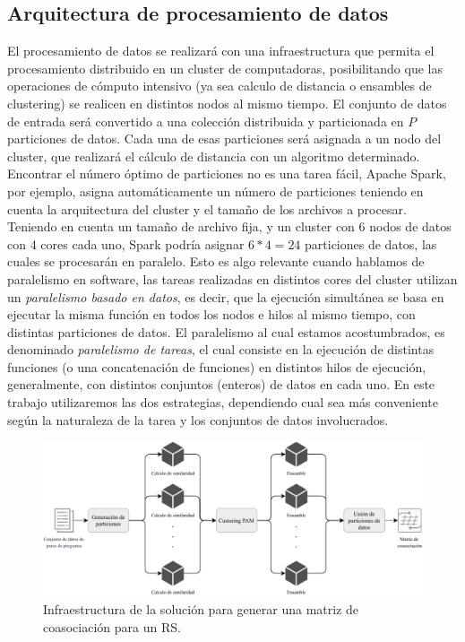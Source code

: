 \subsection{Arquitectura de procesamiento de datos}

El procesamiento de datos se realizará con una infraestructura que permita el procesamiento distribuido en un cluster de computadoras, posibilitando que las operaciones de cómputo intensivo (ya sea calculo de distancia o ensambles de clustering) se realicen en distintos nodos al mismo tiempo. El conjunto de datos de entrada será convertido a una colección distribuida y particionada en \(P\) particiones de datos. Cada una de esas particiones será asignada a un nodo del cluster, que realizará el cálculo de distancia con un algoritmo determinado.
Encontrar el número óptimo de particiones no es una tarea fácil, Apache Spark, por ejemplo, asigna automáticamente un número de particiones teniendo en cuenta la arquitectura del cluster y el tamaño de los archivos a procesar. Teniendo en cuenta un tamaño de archivo fija, y un cluster con 6 nodos de datos con 4 cores cada uno, Spark podría asignar \(6*4=24\) particiones de datos, las cuales se procesarán en paralelo. Esto es algo relevante cuando hablamos de paralelismo en software, las tareas realizadas en distintos cores del cluster utilizan un \textit{paralelismo basado en datos}, es decir, que la ejecución simultánea se basa en ejecutar la misma función en todos los nodos e hilos al mismo tiempo, con distintas particiones de datos. El paralelismo al cual estamos acostumbrados, es denominado \textit{paralelismo de tareas}, el cual consiste en la ejecución de distintas funciones (o una concatenación de funciones) en distintos hilos de ejecución, generalmente, con distintos conjuntos (enteros) de datos en cada uno. En este trabajo utilizaremos las dos estrategias, dependiendo cual sea más conveniente según la naturaleza de la tarea y los conjuntos de datos involucrados.

\begin{figure}
	\centering
	\includegraphics[width=1\linewidth]{8_problema_investigacion/imagenes/equal_distribuido}
	\caption{Infraestructura de la solución para generar una matriz de coasociación para un RS.}
	\label{fig:equaldistribuido}
\end{figure}

